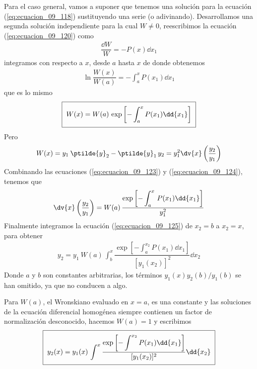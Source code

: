 Para el caso general, vamos a suponer que tenemos una solución para la ecuación (\ref{eq:ecuacion_09_118}) sustituyendo una serie (o adivinando). Desarrollamos una segunda solución independiente para la cual $W \neq 0$, reescribimos la ecuación (\ref{eq:ecuacion_09_120}) como
\begin{align*}
\dfrac{\dd{W}}{W} = - P(x) \dd{x_{1}}
\end{align*}
integramos con respecto a $x$, desde $a$ hasta $x$ de donde obtenemos
\begin{align*}
\ln \dfrac{W(x)}{W(a)} = - \int_{a}^{x} P(x_{1}) \dd{x_{1}}
\end{align*}
que es lo mismo
\begin{align}
\setlength{\fboxsep}{2\fboxsep}\boxed{W(x) = W(a) \, \exp \left[ - \int_{a}^{x} P(x_{1}) \dd{x_{1}} \right]}
\label{eq:ecuacion_09_123}
\end{align}
Pero
\begin{align}
W(x) = y_{1} \: \ptilde{y}_{2} - \ptilde{y}_{1} \, y_{2} = y_{1}^{2} \dv{x} \left( \dfrac{y_{2}}{y_{1}} \right)
\label{eq:ecuacion_09_124}
\end{align}
Combinando las ecuaciones (\ref{eq:ecuacion_09_123}) y (\ref{eq:ecuacion_09_124}), tenemos que
\begin{align}
\dv{x} \left( \dfrac{y_{2}}{y_{1}} \right) =  W(a) \, \dfrac{\exp \left[\displaystyle - \int_{a}^{x} \, P(x_{1}) \dd{x_{1}} \right]}{y^{2}_{1}}
\label{eq:ecuacion_09_125}
\end{align}
Finalmente integramos la ecuación (\ref{eq:ecuacion_09_125}) de $x_{2} = b$ a $x_{2} = x$, para obtener
\begin{align}
y_{2} = y_{1} \: W(a) \, \int_{b}^{x} \dfrac{\exp \left[ \displaystyle - \int_{a}^{x_{2}} P(x_{1}) \dd{x_{1}} \right]}{[y_{1}(x_{2})]^{2}} \dd{x_{2}}
\label{eq:ecuacion_09_126}
\end{align}
Donde $a$ y $b$ son constantes arbitrarias, los términos $y_{1}(x)y_{2}(b)/y_{1}(b)$ se han omitido, ya que no conducen a algo.
\par
Para $W(a)$, el Wronskiano evaluado en $x = a$, es una constante y las soluciones de la ecuación diferencial homogénea siempre contienen un factor de normalización desconocido, hacemos $W(a) = 1$ y escribimos
\begin{align}
\setlength{\fboxsep}{2\fboxsep}\boxed{y_{2}(x) =  y_{1} (x) \,  \int^{x} \dfrac{\exp \left[ \displaystyle - \int^{x_{2}} P(x_{1}) \dd{x_{1}} \right]}{[y_{1}(x_{2})]^{2}} \dd{x_{2}}}
\label{eq:ecuacion_09_127}
\end{align}
